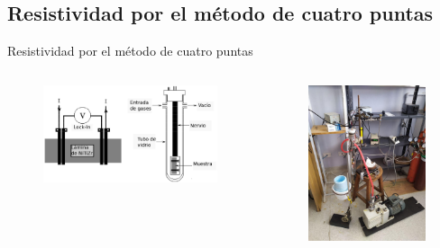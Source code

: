 \documentclass[11pt]{beamer}
\begin{document}
	\subsection{Resistividad por el método de cuatro puntas}
		\begin{frame}{Resistividad por el método de cuatro puntas}
			\begin{columns}
				\begin{column}{.49\textwidth}
					\begin{figure}[H]
						\centering
						\includegraphics[scale=0.3]{img/resistividadImproved.eps}
					\end{figure}
				\end{column}
				\begin{column}{.49\textwidth}
					\begin{figure}[H]
						\centering
						\includegraphics[scale=0.1]{img/resistividad.jpg}

\end{figure}
\end{column}
\end{columns}
\end{frame}
\end{document}
